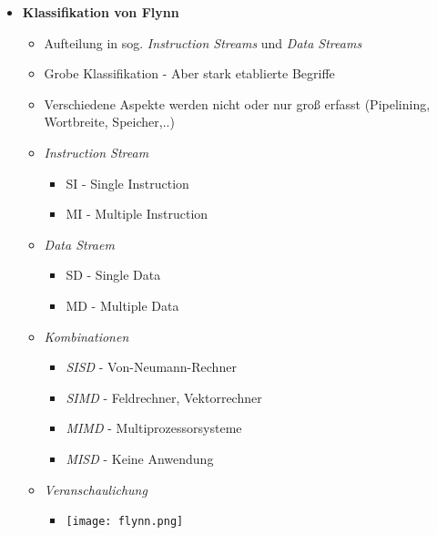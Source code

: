 \begin{itemize}
        \item \textbf{Klassifikation von Flynn}
            \begin{itemize}
                \item Aufteilung in sog. \textit{Instruction Streams} und \textit{Data Streams}
                \item Grobe Klassifikation - Aber stark etablierte Begriffe
                \item Verschiedene Aspekte werden nicht oder nur groß erfasst (Pipelining, Wortbreite, Speicher,..)
                \item \textit{Instruction Stream}
                    \begin{itemize}
                        \item SI - Single Instruction
                        \item MI - Multiple Instruction
                    \end{itemize}
                \item \textit{Data Straem}
                    \begin{itemize}
                        \item SD - Single Data
                        \item MD - Multiple Data
                    \end{itemize}
                \item \textit{Kombinationen}
                    \begin{itemize}
                        \item \textit{SISD} - Von-Neumann-Rechner
                        \item \textit{SIMD} - Feldrechner, Vektorrechner
                        \item \textit{MIMD} - Multiprozessorsysteme
                        \item \textit{MISD} - Keine Anwendung
                    \end{itemize}
                \item \textit{Veranschaulichung}
                    \begin{itemize}
                        \item[] \texttt{[image: flynn.png]}
                    \end{itemize}
    
            \end{itemize}
    \end{itemize}

